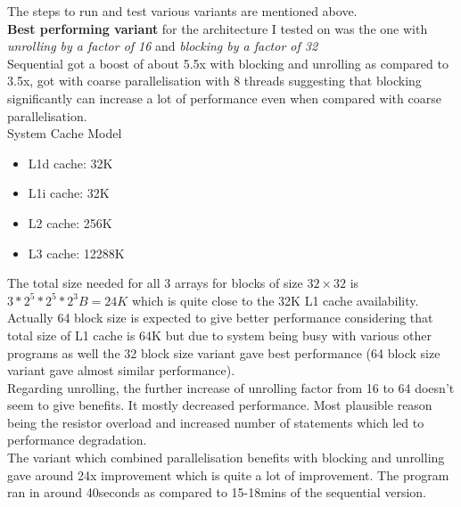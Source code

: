 \documentclass[a4paper]{article}
\begin{document}
The steps to run and test various variants are mentioned above. \\
\newline
{\bf Best performing variant} for the architecture I tested on was the one with {\it unrolling by a factor of 16} and {\it blocking by a factor of 32} \\
\newline
Sequential got a boost of about 5.5x with blocking and unrolling as compared to 3.5x, got with coarse parallelisation with 8 threads suggesting that blocking significantly can increase a lot of performance even when compared with coarse parallelisation. \\
\newline
System Cache Model 
\begin{itemize}
\item L1d cache:           32K
\item L1i cache:           32K
\item L2 cache:            256K
\item L3 cache:            12288K
\end{itemize}
The total size needed for all 3 arrays for blocks of size $32 \times 32$ is $3 * 2^5 * 2^5 * 2^3 B = 24K$ which is quite close to the 32K L1 cache availability. Actually 64 block size is expected to give better performance considering that total size of L1 cache is 64K but due to system being busy with various other programs as well the 32 block size variant gave best performance (64 block size variant gave almost similar performance). \\
\newline
Regarding unrolling, the further increase of unrolling factor from 16 to 64 doesn't seem to give benefits. It mostly decreased performance. Most plausible reason being the resistor overload and increased number of statements which led to performance degradation. \\
\newline
The variant which combined parallelisation benefits with blocking and unrolling gave around 24x improvement which is quite a lot of improvement. The program ran in around 40seconds as compared to 15-18mins of the sequential version.
\end{document}
